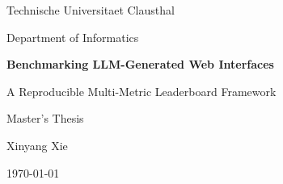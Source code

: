 \documentclass[12pt,a4paper,oneside]{report}
\begin{document}
\hypersetup{pageanchor=false}
\begin{titlepage}
  \centering
  {\Large Technische Universitaet Clausthal\par}
  \vspace{0.5cm}
  {\large Department of Informatics\par}
  \vfill
  {\LARGE\bfseries Benchmarking LLM-Generated Web Interfaces\par}
  \vspace{0.4cm}
  {\Large A Reproducible Multi-Metric Leaderboard Framework\par}
  \vfill
  {\large Master's Thesis\par}
  \vspace{1.5cm}
  {\large Xinyang Xie\par}
  \vspace{0.5cm}
  {\large \today\par}
\end{titlepage}

\hypersetup{pageanchor=true}
\tableofcontents
\clearpage









\appendix

\end{document}

